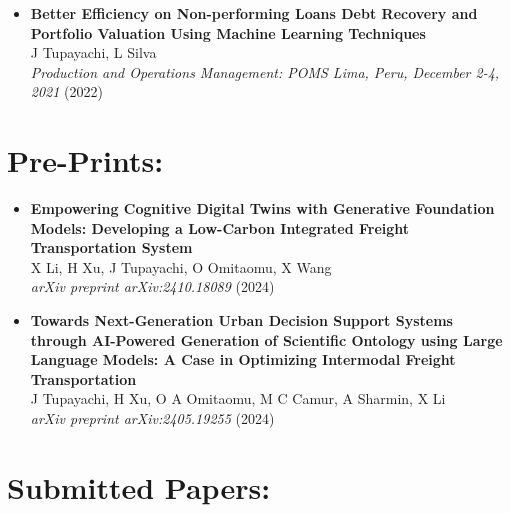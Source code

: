 \documentclass[10pt, letterpaper]{article}
\begin{document}
\begin{itemize}[left=0pt]
        \item \textbf{Better Efficiency on Non-performing Loans Debt Recovery and Portfolio Valuation Using Machine Learning Techniques} \\
        J Tupayachi, L Silva \\
        \textit{Production and Operations Management: POMS Lima, Peru, December 2-4, 2021} (2022) \\
    
    


    \end{itemize}
    

    \section*{Pre-Prints:}

    \begin{itemize}[left=0pt] 

        \item \textbf{Empowering Cognitive Digital Twins with Generative Foundation Models: Developing a Low-Carbon Integrated Freight Transportation System} \\
        X Li, H Xu, J Tupayachi, O Omitaomu, X Wang \\
        \textit{arXiv preprint arXiv:2410.18089} (2024) \\



        \item \textbf{Towards Next-Generation Urban Decision Support Systems through AI-Powered Generation of Scientific Ontology using Large Language Models: A Case in Optimizing Intermodal Freight Transportation} \\
        J Tupayachi, H Xu, O A Omitaomu, M C Camur, A Sharmin, X Li \\
        \textit{arXiv preprint arXiv:2405.19255} (2024)

    \end{itemize}


    \section*{Submitted Papers:}
\end{document}
